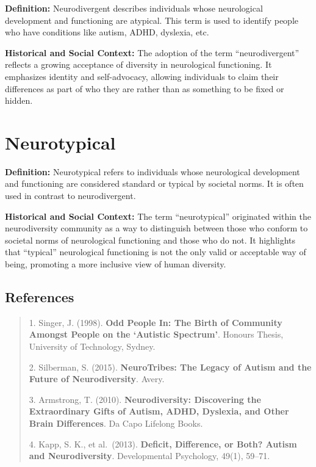 \documentclass[
  letterpaper,
  DIV=11,
  numbers=noendperiod]{scrreprt}
\begin{document}
\textbf{Definition:} Neurodivergent describes individuals whose
neurological development and functioning are atypical. This term is used
to identify people who have conditions like autism, ADHD, dyslexia, etc.

\textbf{Historical and Social Context:} The adoption of the term
``neurodivergent'' reflects a growing acceptance of diversity in
neurological functioning. It emphasizes identity and self-advocacy,
allowing individuals to claim their differences as part of who they are
rather than as something to be fixed or hidden.

\hypertarget{neurotypical}{%
\section{Neurotypical}\label{neurotypical}}

\textbf{Definition:} Neurotypical refers to individuals whose
neurological development and functioning are considered standard or
typical by societal norms. It is often used in contrast to
neurodivergent.

\textbf{Historical and Social Context:} The term ``neurotypical''
originated within the neurodiversity community as a way to distinguish
between those who conform to societal norms of neurological functioning
and those who do not. It highlights that ``typical'' neurological
functioning is not the only valid or acceptable way of being, promoting
a more inclusive view of human diversity.

\hypertarget{references}{%
\subsection{\texorpdfstring{\textbf{References}}{References}}\label{references}}

\begin{quote}
1. Singer, J. (1998). \textbf{Odd People In: The Birth of Community
Amongst People on the `Autistic Spectrum'}. Honours Thesis, University
of Technology, Sydney.

2. Silberman, S. (2015). \textbf{NeuroTribes: The Legacy of Autism and
the Future of Neurodiversity}. Avery.

3. Armstrong, T. (2010). \textbf{Neurodiversity: Discovering the
Extraordinary Gifts of Autism, ADHD, Dyslexia, and Other Brain
Differences}. Da Capo Lifelong Books.

4. Kapp, S. K., et al.~(2013). \textbf{Deficit, Difference, or Both?
Autism and Neurodiversity}. Developmental Psychology, 49(1), 59--71.
\end{quote}
\end{document}
